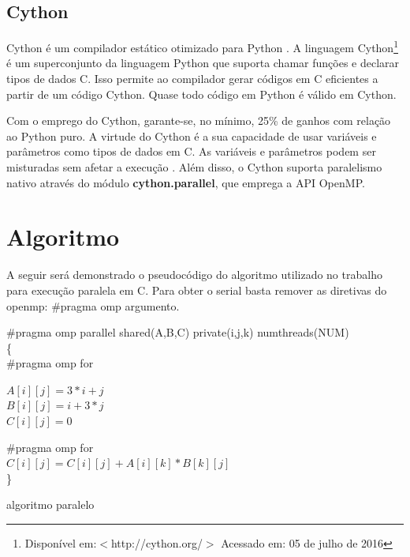\documentclass[a4paper,12pt]{article}
\begin{document}
\subsection{Cython}
Cython é um compilador estático otimizado para Python \cite{cython}. A linguagem Cython\footnote{Disponível em:$<$http://cython.org/$>$ Acessado em: 05 de julho de 2016} é um superconjunto da linguagem Python que suporta chamar funções e declarar tipos de dados C. Isso permite ao compilador gerar códigos em C eficientes a partir de um código Cython. Quase todo código em Python é válido em Cython. 

Com o emprego do Cython, garante-se, no mínimo, 25\% de ganhos com relação ao Python puro. A virtude do Cython é a sua capacidade de usar variáveis e parâmetros como tipos de dados em C. As variáveis e parâmetros podem ser misturadas sem afetar a execução \cite{cython}. Além disso, o Cython suporta paralelismo nativo através do módulo {\bf cython.parallel}, que emprega a API OpenMP. 

\section{Algoritmo}
A seguir será demonstrado o pseudocódigo do algoritmo utilizado no trabalho para execução paralela em C. Para obter o serial basta remover as diretivas do openmp: \#pragma omp argumento. 

\begin{algorithm}[!htb]
   \SetAlgoLined   
   \Inicio
   { 
       \#pragma omp parallel shared(A,B,C) private(i,j,k) num\underline{\space}threads(NUM) \\
       \{\\
        \#pragma omp for\\
        {
            {
                $A[i][j] = 3 \ast  i +  j$\\
        				$B[i][j] = i +  3 \ast  j$\\
	    	    		$C[i][j] = 0$\\
            }  
            
            
        }
        
        \#pragma omp for\\
        {
            {
                {
                   $C[i][j] = C[i][j] + A[i][k] \ast  B[k][j]$\\
                }
            }
        }
      \}
    
   }
   \label{alg:MxM}
   \caption{algoritmo paralelo}
\end{algorithm}
\end{document}
